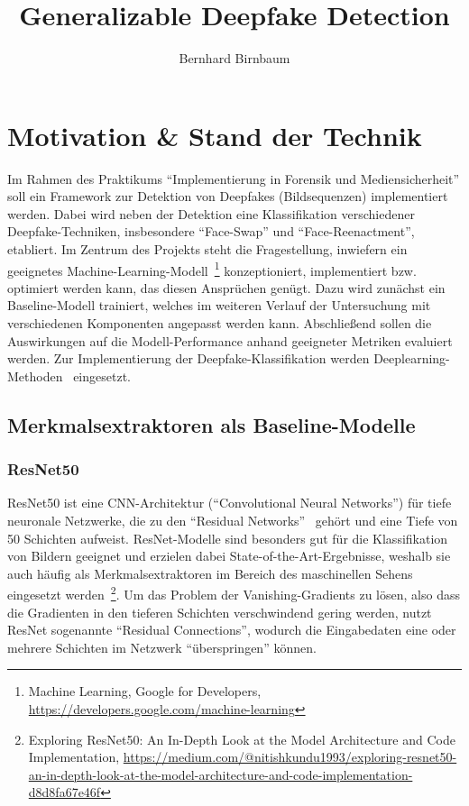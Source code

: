 \documentclass{article}
\title{Generalizable Deepfake Detection}
\author{Bernhard Birnbaum}
\begin{document}
    \maketitle

    \section{Motivation \& Stand der Technik}
    Im Rahmen des Praktikums \enquote{Implementierung in Forensik und Mediensicherheit} soll ein Framework zur Detektion von Deepfakes (Bildsequenzen) implementiert werden.
    Dabei wird neben der Detektion eine Klassifikation verschiedener Deepfake-Techniken, insbesondere \enquote{Face-Swap} und \enquote{Face-Reenactment}, etabliert.
    Im Zentrum des Projekts steht die Fragestellung, inwiefern ein geeignetes Machine-Learning-Modell~\footnote{Machine Learning, Google for Developers, \url{https://developers.google.com/machine-learning}} konzeptioniert, implementiert bzw. optimiert werden kann, das diesen Ansprüchen genügt.
    Dazu wird zunächst ein Baseline-Modell trainiert, welches im weiteren Verlauf der Untersuchung mit verschiedenen Komponenten angepasst werden kann.
    Abschließend sollen die Auswirkungen auf die Modell-Performance anhand geeigneter Metriken evaluiert werden.
    Zur Implementierung der Deepfake-Klassifikation werden Deeplearning-Methoden~\cite{deeplearningbook} eingesetzt.
    \subsection{Merkmalsextraktoren als Baseline-Modelle}
    \subsubsection{ResNet50}
    ResNet50 ist eine CNN-Architektur (\enquote{Convolutional Neural Networks}) für tiefe neuronale Netzwerke, die zu den \enquote{Residual Networks}~\cite{resnet} gehört und eine Tiefe von 50 Schichten aufweist.
    ResNet-Modelle sind besonders gut für die Klassifikation von Bildern geeignet und erzielen dabei State-of-the-Art-Ergebnisse, weshalb sie auch häufig als Merkmalsextraktoren im Bereich des maschinellen Sehens eingesetzt werden~\footnote{Exploring ResNet50: An In-Depth Look at the Model Architecture and Code Implementation, \url{https://medium.com/@nitishkundu1993/exploring-resnet50-an-in-depth-look-at-the-model-architecture-and-code-implementation-d8d8fa67e46f}}.
    Um das Problem der Vanishing-Gradients zu lösen, also dass die Gradienten in den tieferen Schichten verschwindend gering werden, nutzt ResNet sogenannte \enquote{Residual Connections}, wodurch die Eingabedaten eine oder mehrere Schichten im Netzwerk \enquote{überspringen} können.
\end{document}
